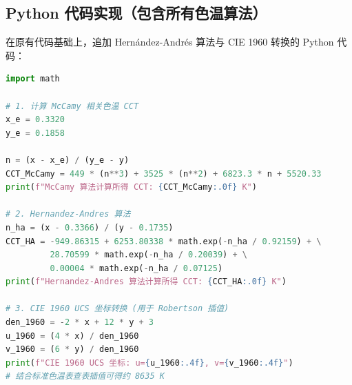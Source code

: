 \documentclass[12pt, a4paper]{ctexart}
\begin{document}
\subsection{Python 代码实现（包含所有色温算法）}
在原有代码基础上，追加 Hernández-Andrés 算法与 CIE 1960 转换的 Python 代码：
\begin{lstlisting}[language=Python, caption={多种相关色温（CCT）算法对比计算}]
import math

# 1. 计算 McCamy 相关色温 CCT
x_e = 0.3320
y_e = 0.1858

n = (x - x_e) / (y_e - y)
CCT_McCamy = 449 * (n**3) + 3525 * (n**2) + 6823.3 * n + 5520.33
print(f"McCamy 算法计算所得 CCT: {CCT_McCamy:.0f} K")

# 2. Hernandez-Andres 算法
n_ha = (x - 0.3366) / (y - 0.1735)
CCT_HA = -949.86315 + 6253.80338 * math.exp(-n_ha / 0.92159) + \
         28.70599 * math.exp(-n_ha / 0.20039) + \
         0.00004 * math.exp(-n_ha / 0.07125)
print(f"Hernandez-Andres 算法计算所得 CCT: {CCT_HA:.0f} K")

# 3. CIE 1960 UCS 坐标转换 (用于 Robertson 插值)
den_1960 = -2 * x + 12 * y + 3
u_1960 = (4 * x) / den_1960
v_1960 = (6 * y) / den_1960
print(f"CIE 1960 UCS 坐标: u={u_1960:.4f}, v={v_1960:.4f}")
# 结合标准色温表查表插值可得约 8635 K
\end{lstlisting}
\end{document}
